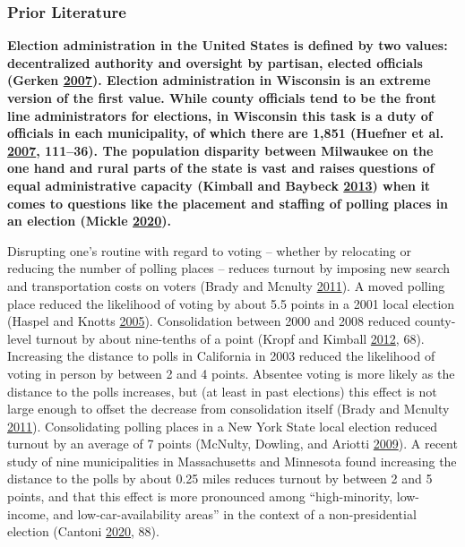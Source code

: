 \documentclass[
  12pt,
]{article}
\begin{document}
\hypertarget{prior-literature}{%
\subsubsection*{Prior Literature}\label{prior-literature}}

\textbf{Election administration in the United States is defined by two values: decentralized authority and oversight by partisan, elected officials (Gerken \protect\hyperlink{ref-Gerken2007}{2007}). Election administration in Wisconsin is an extreme version of the first value. While county officials tend to be the front line administrators for elections, in Wisconsin this task is a duty of officials in each municipality, of which there are 1,851 (Huefner et al. \protect\hyperlink{ref-Huefner2007}{2007}, 111--36). The population disparity between Milwaukee on the one hand and rural parts of the state is vast and raises questions of equal administrative capacity (Kimball and Baybeck \protect\hyperlink{ref-Kimball2013}{2013}) when it comes to questions like the placement and staffing of polling places in an election (Mickle \protect\hyperlink{ref-Mickle2020}{2020}).}

Disrupting one's routine with regard to voting -- whether by relocating or reducing the number of polling places -- reduces turnout by imposing new search and transportation costs on voters (Brady and Mcnulty \protect\hyperlink{ref-Brady2011}{2011}). A moved polling place reduced the likelihood of voting by about 5.5 points in a 2001 local election (Haspel and Knotts \protect\hyperlink{ref-Haspel2005}{2005}). Consolidation between 2000 and 2008 reduced county-level turnout by about nine-tenths of a point (Kropf and Kimball \protect\hyperlink{ref-Kropf2012}{2012}, 68). Increasing the distance to polls in California in 2003 reduced the likelihood of voting in person by between 2 and 4 points. Absentee voting is more likely as the distance to the polls increases, but (at least in past elections) this effect is not large enough to offset the decrease from consolidation itself (Brady and Mcnulty \protect\hyperlink{ref-Brady2011}{2011}). Consolidating polling places in a New York State local election reduced turnout by an average of 7 points (McNulty, Dowling, and Ariotti \protect\hyperlink{ref-McNulty2009}{2009}). A recent study of nine municipalities in Massachusetts and Minnesota found increasing the distance to the polls by about 0.25 miles reduces turnout by between 2 and 5 points, and that this effect is more pronounced among ``high-minority, low-income, and low-car-availability areas'' in the context of a non-presidential election (Cantoni \protect\hyperlink{ref-Cantoni2020}{2020}, 88).
\end{document}
